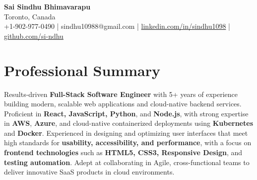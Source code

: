 \documentclass[letterpaper,11pt]{article}
\begin{document}
\begin{center}
  {\Large \textbf{Sai Sindhu Bhimavarapu}} \\
  Toronto, Canada \\
  +1-902-977-0490 \enspace | \enspace sindhu10988@gmail.com \enspace | \enspace \href{https://www.linkedin.com/in/sindhu1098/}{linkedin.com/in/sindhu1098} \enspace | \enspace \href{https://github.com/si-ndhu}{github.com/si-ndhu}
\end{center}

\section{Professional Summary}
  \begin{itemize}[leftmargin=0.15in, label={}]
    \small{\item{
     Results-driven \textbf{Full-Stack Software Engineer} with 5+ years of experience building modern, scalable web applications and cloud-native backend services. Proficient in \textbf{React, JavaScript, Python}, and \textbf{Node.js}, with strong expertise in \textbf{AWS}, \textbf{Azure}, and cloud-native containerized deployments using \textbf{Kubernetes} and \textbf{Docker}. Experienced in designing and optimizing user interfaces that meet high standards for \textbf{usability, accessibility, and performance}, with a focus on \textbf{frontend technologies} such as \textbf{HTML5, CSS3, Responsive Design}, and \textbf{testing automation}. Adept at collaborating in Agile, cross-functional teams to deliver innovative SaaS products in cloud environments.
    }}
  \end{itemize}
\vspace{-16pt}

\end{document}
